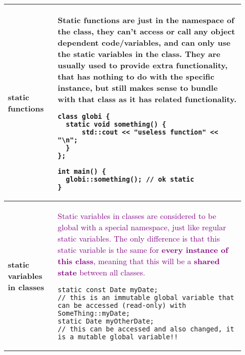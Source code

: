 \documentclass[main.tex,fontsize=8pt,paper=a4,paper=portrait,DIV=calc,]{scrartcl}
\begin{document}
\begin{table}[ht!]
\begin{tabular}{|m{0.2\linewidth}|m{0.755\linewidth}|}
\hline
static functions & 
Static functions are just in the namespace of the class, they can't access or call any object dependent code/variables, and can only use the static variables in the class.\newline
They are usually used to provide extra functionality, that has nothing to do with the specific instance, but still makes sense to bundle with that class as it has related functionality.\newline
\begin{lstlisting}
class globi {
  static void something() {
      std::cout << "useless function" << "\n";
  }
};

int main() { 
  globi::something(); // ok static
}
\end{lstlisting}\\
\hline
\textbf{static variables in classes} &
\textcolor{purple}{Static variables in classes are considered to be global with a special namespace, just like regular static variables.\newline
The only difference is that this static variable is the same for \textbf{every instance of this class}, meaning that this will be a \textbf{shared state} between all classes.}
\begin{lstlisting}
static const Date myDate;
// this is an immutable global variable that can be accessed (read-only) with SomeThing::myDate;
static Date myOtherDate;
// this can be accessed and also changed, it is a mutable global variable!!
\end{lstlisting}\\
\hline
\end{tabular}

\end{table}
\end{document}
